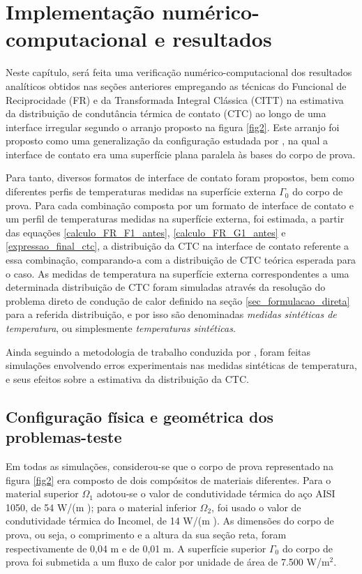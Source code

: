 \section{Implementação numérico-computacional e resultados}

Neste capítulo, será feita uma verificação numérico-computacional dos resultados analíticos obtidos nas seções anteriores empregando as técnicas do Funcional de Reciprocidade (FR) e da Transformada Integral Clássica (CITT) na estimativa da distribuição de condutância térmica de contato (CTC) ao longo de uma interface irregular segundo o arranjo proposto na figura \ref{fig2}. Este arranjo foi proposto como uma generalização da configuração estudada por \cite{tese_padilha}, na qual a interface de contato era uma superfície plana paralela às bases do corpo de prova.

Para tanto, diversos formatos de interface de contato foram propostos, bem como diferentes perfis de temperaturas medidas na superfície externa $\Gamma_0$ do corpo de prova. Para cada combinação composta por um formato de interface de contato e um perfil de temperaturas medidas na superfície externa, foi estimada, a partir das equações \eqref{calculo_FR_F1_antes}, \eqref{calculo_FR_G1_antes} e \eqref{expressao_final_ctc}, a distribuição da CTC na interface de contato referente a essa combinação, comparando-a com a distribuição de CTC teórica esperada para o caso. As medidas de temperatura na superfície externa correspondentes a uma determinada distribuição de CTC foram simuladas através da resolução do problema direto de condução de calor definido na seção \ref{sec_formulacao_direta} para a referida distribuição, e por isso são denominadas \textit{medidas sintéticas de temperatura}, ou simplesmente \textit{temperaturas sintéticas}.

Ainda seguindo a metodologia de trabalho conduzida por \cite{tese_padilha}, foram feitas simulações envolvendo erros experimentais nas medidas sintéticas de temperatura, e seus efeitos sobre a estimativa da distribuição da CTC.

\subsection{Configuração física e geométrica dos problemas-teste}\label{config_fis_geom}

Em todas as simulações, considerou-se que o corpo de prova representado na figura \ref{fig2} era composto de dois compósitos de materiais diferentes. Para o material superior $\Omega_1$ adotou-se o valor de condutividade térmica do aço AISI 1050, de 54 W/(m \celsius); para o material inferior $\Omega_2$, foi usado o valor de condutividade térmica do Incomel, de 14 W/(m \celsius). As dimensões do corpo de prova, ou seja, o comprimento e a altura da sua seção reta, foram respectivamente de 0,04 m e de 0,01 m. A superfície superior $\Gamma_0$ do corpo de prova foi submetida a um fluxo de calor por unidade de área de 7.500 W/$\text{m}^2$.

